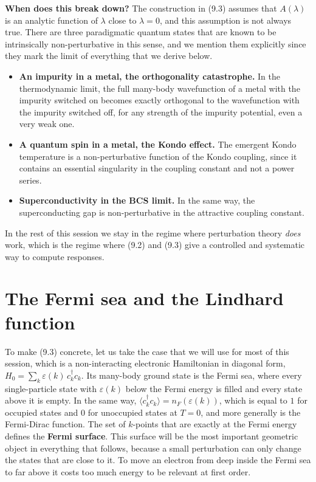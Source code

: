 \textbf{When does this break down?} The construction in (9.3) assumes that $A(\lambda)$ is an
analytic function of $\lambda$ close to $\lambda=0$, and this assumption is not always true. There
are three paradigmatic quantum states that are known to be intrinsically non-perturbative in this
sense, and we mention them explicitly since they mark the limit of everything that we derive below.

\begin{itemize}
\item \textbf{An impurity in a metal, the orthogonality catastrophe.} In the thermodynamic limit, the full
  many-body wavefunction of a metal with the impurity switched on becomes exactly orthogonal to the
  wavefunction with the impurity switched off, for any strength of the impurity potential, even a
  very weak one.
\item \textbf{A quantum spin in a metal, the Kondo effect.} The emergent Kondo temperature is a
  non-perturbative function of the Kondo coupling, since it contains an essential singularity in the
  coupling constant and not a power series.
\item \textbf{Superconductivity in the BCS limit.} In the same way, the superconducting gap is
  non-perturbative in the attractive coupling constant.
\end{itemize}

In the rest of this session we stay in the regime where perturbation theory \emph{does} work, which
is the regime where (9.2) and (9.3) give a controlled and systematic way to compute responses.

\section{The Fermi sea and the Lindhard function}

To make (9.3) concrete, let us take the case that we will use for most of this session, which is a
non-interacting electronic Hamiltonian in diagonal form, $H_0 = \sum_k \varepsilon(k)\, c_k^\dagger
c_k$. Its many-body ground state is the Fermi sea, where every single-particle state with
$\varepsilon(k)$ below the Fermi energy is filled and every state above it is empty. In the same way,
$\langle c_k^\dagger c_k\rangle = n_F(\varepsilon(k))$, which is equal to $1$ for occupied states and
$0$ for unoccupied states at $T=0$, and more generally is the Fermi-Dirac function. The set of
$k$-points that are exactly at the Fermi energy defines the \textbf{Fermi surface}. This surface will
be the most important geometric object in everything that follows, because a small perturbation can
only change the states that are close to it. To move an electron from deep inside the Fermi sea to
far above it costs too much energy to be relevant at first order.

